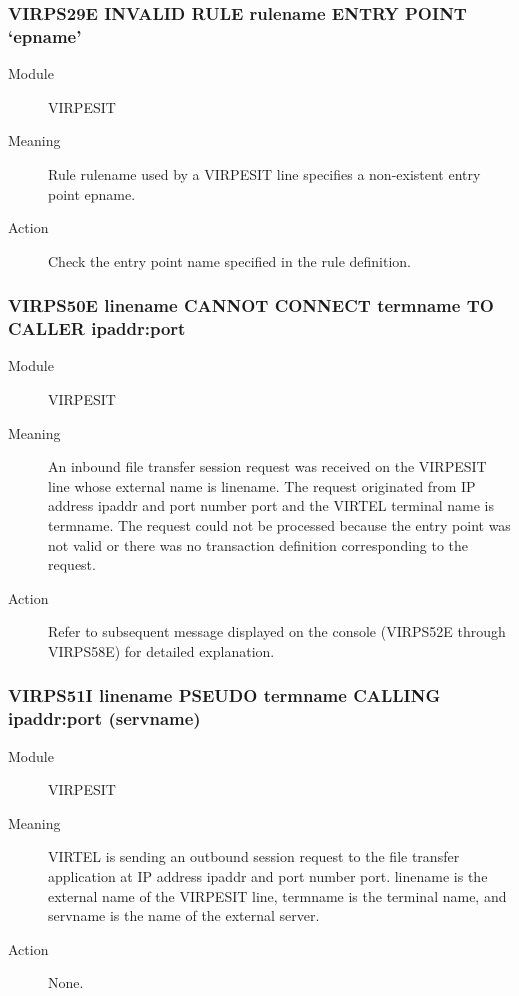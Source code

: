 \documentclass[letterpaper,10pt,english]{sphinxmanual}
\begin{document}
\subsubsection{VIRPS29E INVALID RULE rulename ENTRY POINT ‘epname’}
\label{\detokenize{messages:virps29e-invalid-rule-rulename-entry-point-epname}}\begin{description}
\item[{Module}] \leavevmode
VIRPESIT

\item[{Meaning}] \leavevmode
Rule rulename used by a VIRPESIT line specifies a non-existent entry point epname.

\item[{Action}] \leavevmode
Check the entry point name specified in the rule definition.

\end{description}


\subsubsection{VIRPS50E linename CANNOT CONNECT termname TO CALLER ipaddr:port}
\label{\detokenize{messages:virps50e-linename-cannot-connect-termname-to-caller-ipaddr-port}}\begin{description}
\item[{Module}] \leavevmode
VIRPESIT

\item[{Meaning}] \leavevmode
An inbound file transfer session request was received on the VIRPESIT line whose external name is linename. The request originated from IP address ipaddr  and port number port and the VIRTEL terminal  name is termname.     The request could not be processed because the entry point was not valid or there was no transaction definition corresponding to the request.

\item[{Action}] \leavevmode
Refer to subsequent message displayed on the console (VIRPS52E through VIRPS58E) for detailed explanation.

\end{description}


\subsubsection{VIRPS51I linename PSEUDO termname CALLING ipaddr:port (servname)}
\label{\detokenize{messages:virps51i-linename-pseudo-termname-calling-ipaddr-port-servname}}\begin{description}
\item[{Module}] \leavevmode
VIRPESIT

\item[{Meaning}] \leavevmode
VIRTEL is sending an outbound session request to the file transfer application at IP address ipaddr and port number port. linename is the external name of the VIRPESIT line, termname is the terminal name, and servname is the name of the external server.

\item[{Action}] \leavevmode
None.

\end{description}
\end{document}
